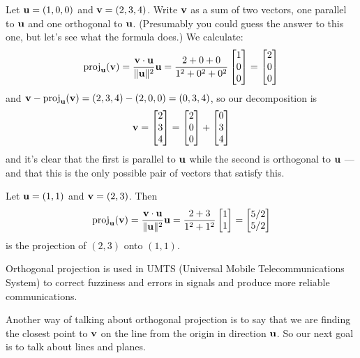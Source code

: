 \begin{myexample}
Let $\mathbf{u} = (1,0,0)$ and $\mathbf{v} = (2,3,4)$.  Write $\mathbf{v}$ as a sum
of two vectors, one parallel to $\mathbf{u}$ and one orthogonal to $\mathbf{u}$.
(Presumably you could guess the answer to this one, but let's
see what the formula does.)  We calculate:
$$
\operatorname{proj}_{\mathbf{u}}(\mathbf{v}) = \frac{\mathbf{v} \cdot \mathbf{u}}{\Vert \mathbf{u} \Vert^2} \mathbf{u}
= \frac{2+0+0}{1^2+0^2+0^2}\left[ \begin{matrix} 1\\0\\0 \end{matrix} \right] = \left[ \begin{matrix} 2\\0\\0 \end{matrix} \right]
$$
and $\mathbf{v} - \operatorname{proj}_{\mathbf{u}}(\mathbf{v}) = (2,3,4)-(2,0,0) = (0,3,4)$, so our
decomposition is
$$
\mathbf{v} = \left[ \begin{matrix} 2\\3\\4 \end{matrix} \right] = \left[ \begin{matrix} 2\\0\\0 \end{matrix} \right]+\left[ \begin{matrix} 0\\3\\4 \end{matrix} \right]
$$
and it's clear that the first is parallel to $\mathbf{u}$ while the 
second is orthogonal to $\mathbf{u}$ --- and that this is the only
possible pair of vectors that satisfy this.
\end{myexample}

\begin{myexample}
Let $\mathbf{u} = (1,1)$ and $\mathbf{v} = (2,3)$.  Then
$$
\operatorname{proj}_{\mathbf{u}}(\mathbf{v}) = \frac{\mathbf{v} \cdot \mathbf{u}}{\Vert \mathbf{u} \Vert^2} \mathbf{u}
= \frac{2+3}{1^2+1^2}\left[ \begin{matrix} 1\\1 \end{matrix} \right] = \left[ \begin{matrix} 5/2\\ 5/2 \end{matrix} \right]
$$
is the projection of $(2,3)$ onto $(1,1)$.
\end{myexample}

Orthogonal projection is used in UMTS (Universal Mobile Telecommunications System) to correct fuzziness and errors in signals and produce more reliable
communications.

Another way of talking about orthogonal projection is to say that
we are finding the closest point to $\mathbf{v}$ on the line from the origin in
direction $\mathbf{u}$.  So our next goal is to talk about lines and planes.


